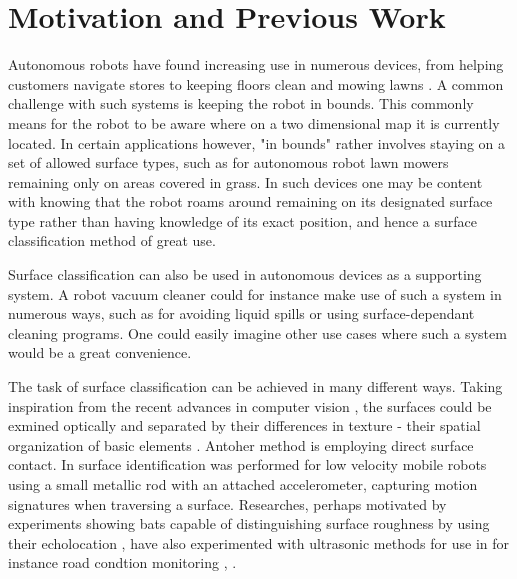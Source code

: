 \section{Motivation and Previous Work}

Autonomous robots have found increasing use in numerous devices, from helping customers navigate stores \citep{mcsweeney_2018} to keeping floors clean \citep{sanfacon_2017} and mowing lawns \citep{udelhofen_2018}. A common challenge with such systems is keeping the robot in bounds. This commonly means for the robot to be aware where on a two dimensional map it is currently located. In certain applications however, "in bounds" rather involves staying on a set of allowed surface types, such as for autonomous robot lawn mowers remaining only on areas covered in grass. In such devices one may be content with knowing that the robot roams around remaining on its designated surface type rather than having knowledge of its exact position, and hence a surface classification method of great use. 

Surface classification can also be used in autonomous devices as a supporting system. A robot vacuum cleaner could for instance make use of such a system in numerous ways, such as for avoiding liquid spills or using surface-dependant cleaning programs. One could easily imagine other use cases where such a system would be a great convenience.

The task of surface classification can be achieved in many different ways. Taking inspiration from the recent advances in computer vision \citep{liu_chen_fieguth_zhao_chellappa_pietikäinen_2018}, the surfaces could be exmined optically and separated by their differences in texture - their spatial organization of basic elements \citep{do_vetterli_2002}. Antoher method is employing direct surface contact. In \citep{giguere_dudek_2011} surface identification was performed for low velocity mobile robots using a small metallic rod with an attached accelerometer, capturing motion signatures when traversing a surface. Researches, perhaps motivated by experiments showing bats capable of distinguishing surface roughness by using their echolocation \citep{schmidt_1988}, have also experimented with ultrasonic methods for use in for instance road condtion monitoring \citep{bystrov_2016}, \citep{mckerrow_kristiansen_2006}. 

